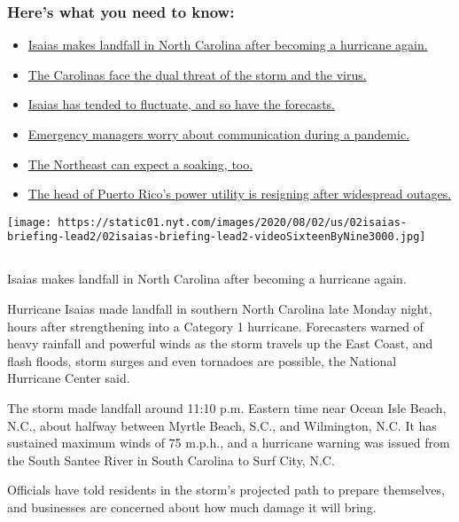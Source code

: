 \hypertarget{heres-what-you-need-to-know}{%
\subsubsection{Here's what you need to
know:}\label{heres-what-you-need-to-know}}

\begin{itemize}
\tightlist
\item
  \protect\hyperlink{link-34a2c843}{Isaias makes landfall in North
  Carolina after becoming a hurricane again.}
\item
  \protect\hyperlink{link-f7e08eb}{The Carolinas face the dual threat of
  the storm and the virus.}
\item
  \protect\hyperlink{link-64deafd3}{Isaias has tended to fluctuate, and
  so have the forecasts.}
\item
  \protect\hyperlink{link-536a9c31}{Emergency managers worry about
  communication during a pandemic.}
\item
  \protect\hyperlink{link-52f7dcb}{The Northeast can expect a soaking,
  too.}
\item
  \protect\hyperlink{link-303d84ae}{The head of Puerto Rico's power
  utility is resigning after widespread outages.}
\end{itemize}

\texttt{[image: https://static01.nyt.com/images/2020/08/02/us/02isaias-briefing-lead2/02isaias-briefing-lead2-videoSixteenByNine3000.jpg]}

\subsection{}

Isaias makes landfall in North Carolina after becoming a hurricane
again.

Hurricane Isaias made landfall in southern North Carolina late Monday
night, hours after strengthening into a Category 1 hurricane.
Forecasters warned of heavy rainfall and powerful winds as the storm
travels up the East Coast, and flash floods, storm surges and even
tornadoes are possible, the National Hurricane Center said.

The storm made landfall around 11:10 p.m. Eastern time near Ocean Isle
Beach, N.C., about halfway between Myrtle Beach, S.C., and Wilmington,
N.C. It has sustained maximum winds of 75 m.p.h., and a hurricane
warning was issued from the South Santee River in South Carolina to Surf
City, N.C.

Officials have told residents in the storm's projected path to prepare
themselves, and businesses are concerned about how much damage it will
bring.

